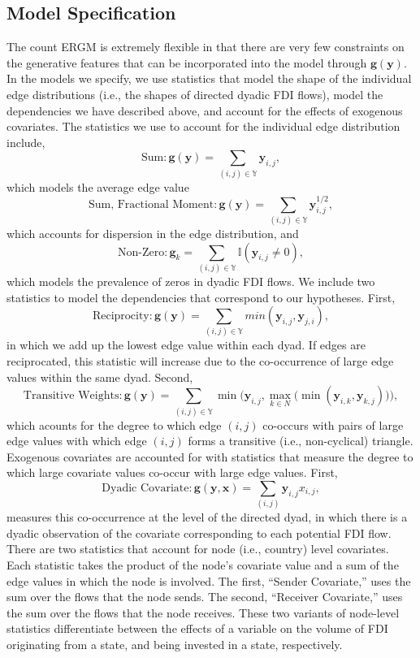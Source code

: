 \documentclass{article}
\begin{document}
\subsection{Model Specification}
The count ERGM is extremely flexible in that there are very few constraints on the generative features that can be incorporated into the model through $\bm{g}( \bm{y} )$. In the models we specify, we use statistics that model the shape of the individual edge distributions (i.e., the shapes of directed dyadic FDI flows), model the dependencies we have described above, and account for the effects of exogenous covariates. The statistics we use to account for the individual edge distribution include, $$\text{Sum}:\bm{g(y)} = \sum_{(i,j) {\in} \mathbb{Y}}\bm{y}_{i,j},$$ which models the average edge value $$\text{Sum, Fractional Moment}:\bm{g(y)} = \sum_{(i,j) {\in} \mathbb{Y}}\bm{y}_{i,j}^{1/2},$$ which accounts for dispersion in the edge distribution, and
$$\text{Non-Zero}: \bm{g}_k = \sum_{(i,j) {\in} \mathbb{Y}} \mathbb{I}(\bm{y}_{i,j} \neq 0),$$ which models the prevalence of zeros in dyadic FDI flows. We include two statistics to model the dependencies that correspond to our hypotheses. First,
$$ \text{Reciprocity}: \bm{g(y)} = \sum_{(i,j) {\in} \mathbb{Y}}min(\bm{y}_{i,j},\bm{y}_{j,i}),$$ in which we add up the lowest edge value within each dyad. If edges are reciprocated, this statistic will increase due to the co-occurrence of large edge values within the same dyad. Second, 
$$\text{Transitive Weights}: \bm{g(y)} =  \sum_{(i,j) {\in} \mathbb{Y}}\min\bigg( \bm{y}_{i,j}, \max\limits_{k{\in}N}\Big(\min(\bm{y}_{i,k},\bm{y}_{k,j})\Big) \bigg),$$ which acounts for the degree to which edge $(i,j)$ co-occurs with pairs of large edge values with which  edge $(i,j)$ forms a transitive (i.e., non-cyclical) triangle. Exogenous covariates are accounted for with statistics that measure the degree to which large covariate values co-occur with large edge values. First,
$$ \text{Dyadic Covariate}: \bm{g(y,x)} = \sum_{(i,j)} \bm{y}_{i,j}x_{i,j},$$ measures this co-occurrence at the level of the directed dyad, in which there is a dyadic observation of the covariate corresponding to each potential FDI flow. There are two statistics that account for node (i.e., country) level covariates. Each statistic takes the product of the node's covariate value and a sum of the edge values in which the node is involved. The first, ``Sender Covariate,'' uses the sum over the flows that the node sends. The second, ``Receiver Covariate,'' uses the sum over the flows that the node receives. These two variants of node-level statistics differentiate between the effects of a variable on the volume of FDI originating from a state, and being invested in a state, respectively.
\end{document}
